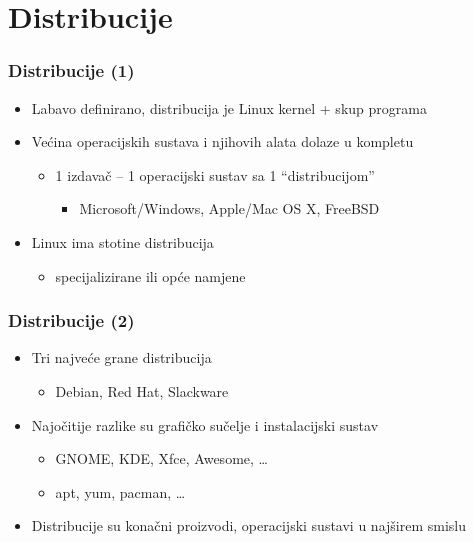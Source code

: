 \documentclass{beamer}
\begin{document}
\section{Distribucije}
\begin{frame}[t]
\frametitle{Distribucije (1)}
\begin{itemize}
  \item Labavo definirano, distribucija je Linux kernel + skup programa
  \item Većina operacijskih sustava i njihovih alata dolaze u kompletu
  \begin{itemize}
    \item 1 izdavač -- 1 operacijski sustav sa 1 ``distribucijom''
    \begin{itemize}
      \item Microsoft/Windows, Apple/Mac OS X, FreeBSD
    \end{itemize}
  \end{itemize}
  \item Linux ima stotine distribucija
  \begin{itemize}
    \item specijalizirane ili opće namjene
  \end{itemize}
\end{itemize}
\end{frame}

\begin{frame}[t]
\frametitle{Distribucije (2)}
\begin{itemize}
  \item Tri najveće grane distribucija
  \begin{itemize}
    \item Debian, Red Hat, Slackware
  \end{itemize}
  \item Najočitije razlike su grafičko sučelje i instalacijski sustav
  \begin{itemize}
    \item GNOME, KDE, Xfce, Awesome, \ldots
    \item apt, yum, pacman, \ldots
  \end{itemize}
  \item Distribucije su konačni proizvodi, operacijski sustavi u 
        najširem smislu
\end{itemize}
\end{frame}
\end{document}
